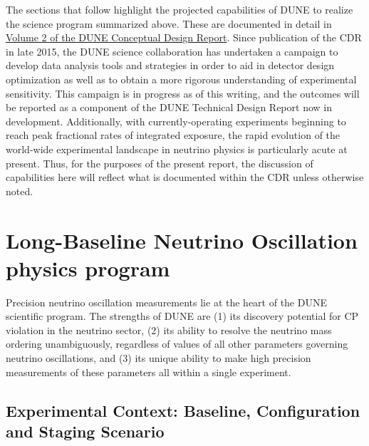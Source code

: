 The sections that follow highlight the projected capabilities of DUNE to realize the science program 
summarized above. These are documented in detail in \href{http://arxiv.org/abs/1512.06148}{Volume 2 
of the DUNE Conceptual Design Report}.  Since publication of the CDR in late 2015, the DUNE science 
collaboration has undertaken a campaign to develop data analysis tools and strategies in order to aid 
in detector design optimization as well as to obtain a more rigorous understanding of experimental 
sensitivity.  This campaign is in progress as of this writing, and the outcomes will be reported 
as a component of the DUNE Technical Design Report now in development.  Additionally, with 
currently-operating experiments beginning to reach peak fractional rates of integrated exposure, 
the rapid evolution of the world-wide experimental landscape in neutrino physics is particularly acute 
at present.  Thus, for the purposes of the present report, the discussion of capabilities here 
will reflect what is documented within the CDR unless otherwise noted.

\section{Long-Baseline Neutrino Oscillation physics program}
\label{sec:exec-summ-physics-osc}

Precision neutrino oscillation measurements lie at the heart of the DUNE scientific program.  The strengths of DUNE are (1) its discovery potential for CP violation in the neutrino sector, (2) its ability to resolve the neutrino mass ordering unambiguously, regardless of values of all other parameters governing neutrino oscillations, and (3) its unique ability to make high precision measurements of these parameters all within a single experiment.

\subsection{Experimental Context: Baseline, Configuration and Staging Scenario}


